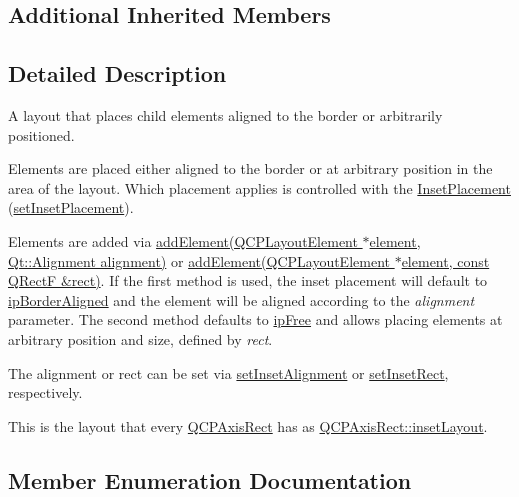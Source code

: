 \subsection*{Additional Inherited Members}


\subsection{Detailed Description}
A layout that places child elements aligned to the border or arbitrarily positioned. 

Elements are placed either aligned to the border or at arbitrary position in the area of the layout. Which placement applies is controlled with the \hyperlink{class_q_c_p_layout_inset_a8b9e17d9a2768293d2a7d72f5e298192}{Inset\+Placement} (\hyperlink{class_q_c_p_layout_inset_a63298830744d5d8c5345511c00fd2144}{set\+Inset\+Placement}).

Elements are added via \hyperlink{class_q_c_p_layout_inset_ad61529eb576af7f04dff94abb10c745a}{add\+Element(\+Q\+C\+P\+Layout\+Element $\ast$element, Qt\+::\+Alignment alignment)} or \hyperlink{class_q_c_p_layout_inset_a8ff61fbee4a1f0ff45c398009d9f1e56}{add\+Element(\+Q\+C\+P\+Layout\+Element $\ast$element, const Q\+Rect\+F \&rect)}. If the first method is used, the inset placement will default to \hyperlink{class_q_c_p_layout_inset_a8b9e17d9a2768293d2a7d72f5e298192aa81e7df4a785ddee2229a8f47c46e817}{ip\+Border\+Aligned} and the element will be aligned according to the {\itshape alignment} parameter. The second method defaults to \hyperlink{class_q_c_p_layout_inset_a8b9e17d9a2768293d2a7d72f5e298192aa4802986ea2cea457f932b115acba59e}{ip\+Free} and allows placing elements at arbitrary position and size, defined by {\itshape rect}.

The alignment or rect can be set via \hyperlink{class_q_c_p_layout_inset_a62882a4f9ad58bb0f53da12fde022abe}{set\+Inset\+Alignment} or \hyperlink{class_q_c_p_layout_inset_aa487c8378a6f9533567a2e6430099dc3}{set\+Inset\+Rect}, respectively.

This is the layout that every \hyperlink{class_q_c_p_axis_rect}{Q\+C\+P\+Axis\+Rect} has as \hyperlink{class_q_c_p_axis_rect_a949f803466619924c7018df4b511ae10}{Q\+C\+P\+Axis\+Rect\+::inset\+Layout}. 

\subsection{Member Enumeration Documentation}
\mbox{\label{class_q_c_p_layout_inset_a8b9e17d9a2768293d2a7d72f5e298192}} 
